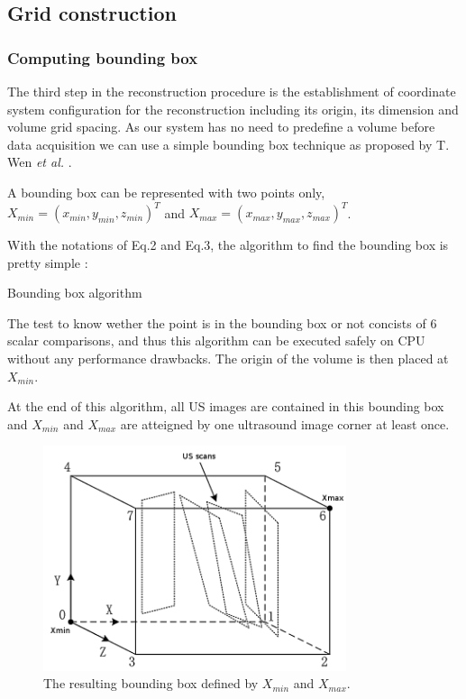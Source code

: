 \documentclass[12pt,journal,compsoc]{IEEEtran}
\begin{document}
\subsection{Grid construction}

\subsubsection{Computing bounding box}
The third step in the reconstruction procedure is the establishment of coordinate system configuration for the reconstruction including its origin, its dimension and volume grid spacing. As our system has no need to predefine a volume before data acquisition we can use a simple bounding box technique as proposed by T. Wen \textit{et al.} \cite{2}.

A bounding box can be represented with two points only, $X_{min} = (x_{min},y_{min},z_{min})^T$ and $X_{max} = (x_{max}, y_{max}, z_{max})^T$.

With the notations of Eq.2 and Eq.3, the algorithm to find the bounding box is pretty simple :

\begin{algorithm}
\caption{Bounding box algorithm}
\end{algorithm}
	
The test to know wether the point is in the bounding box or not concists of 6 scalar comparisons, and thus this algorithm can be executed safely on CPU without any performance drawbacks.
The origin of the volume is then placed at $X_{min}$.

At the end of this algorithm, all US images are contained in this bounding box and $X_{min}$ and $X_{max}$ are atteigned by one ultrasound image corner at least once.


\begin{figure}[h!]
\centering
\includegraphics[width=3.5in]{bounding_box}
\caption{The resulting bounding box defined by $X_{min}$ and $X_{max}$.}
\label{fig_2}
\end{figure}
\end{document}
